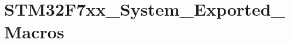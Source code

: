 \hypertarget{group___s_t_m32_f7xx___system___exported___macros}{}\section{S\+T\+M32\+F7xx\+\_\+\+System\+\_\+\+Exported\+\_\+\+Macros}
\label{group___s_t_m32_f7xx___system___exported___macros}
